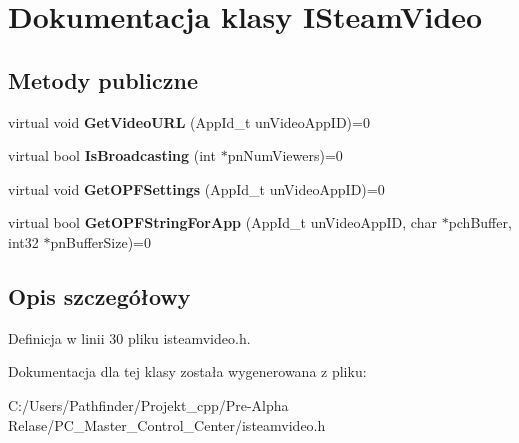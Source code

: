 \hypertarget{class_i_steam_video}{}\section{Dokumentacja klasy I\+Steam\+Video}
\label{class_i_steam_video}
\subsection*{Metody publiczne}
\begin{DoxyCompactItemize}
\item 
\mbox{\label{class_i_steam_video_a552ef1fdc8c22e87a8ba400f738ecbe6}} 
virtual void {\bfseries Get\+Video\+U\+RL} (App\+Id\+\_\+t un\+Video\+App\+ID)=0
\item 
\mbox{\label{class_i_steam_video_a51295a7fbe8cce21c7a63f9633360205}} 
virtual bool {\bfseries Is\+Broadcasting} (int $\ast$pn\+Num\+Viewers)=0
\item 
\mbox{\label{class_i_steam_video_a050d46d6da17047d159164b638509f27}} 
virtual void {\bfseries Get\+O\+P\+F\+Settings} (App\+Id\+\_\+t un\+Video\+App\+ID)=0
\item 
\mbox{\label{class_i_steam_video_a7310e6c17f10c7c6cdf4012651b7cc6a}} 
virtual bool {\bfseries Get\+O\+P\+F\+String\+For\+App} (App\+Id\+\_\+t un\+Video\+App\+ID, char $\ast$pch\+Buffer, int32 $\ast$pn\+Buffer\+Size)=0
\end{DoxyCompactItemize}


\subsection{Opis szczegółowy}


Definicja w linii 30 pliku isteamvideo.\+h.



Dokumentacja dla tej klasy została wygenerowana z pliku\+:\begin{DoxyCompactItemize}
\item 
C\+:/\+Users/\+Pathfinder/\+Projekt\+\_\+cpp/\+Pre-\/\+Alpha Relase/\+P\+C\+\_\+\+Master\+\_\+\+Control\+\_\+\+Center/isteamvideo.\+h\end{DoxyCompactItemize}
